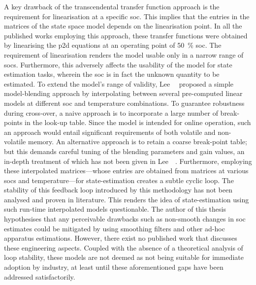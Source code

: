 A  key  drawback  of  the  transcendental  transfer  function  approach  is  the
requirement for  linearisation at  a specific \gls{soc}.  This implies  that the
entries in  the matrices of the  state space model depends  on the linearisation
point.  In all  the  published  works employing  this  approach, these  transfer
functions were obtained  by linearising the \gls{p2d} equations  at an operating
point of  \SI{50}{\percent} \gls{soc}. The requirement  of linearisation renders
the  model usable  only  in  a narrow  range  of  \gls{soc}s. Furthermore,  this
adversely affects the usability of the model for state estimation tasks, wherein
the  \gls{soc} is  in  fact the  unknown  quantity to  be  estimated. To  extend
the  model's range  of  validity, Lee~\etal{}~\cite{Lee2014}  proposed a  simple
model-blending  approach by  interpolating between  several pre-computed  linear
models  at  different  \gls{soc}  and  temperature  combinations.  To  guarantee
robustness during cross-over, a naive approach  is to incorporate a large number
of break-points  in the look-up  table. Since the  model is intended  for online
operation,  such  an approach  would  entail  significant requirements  of  both
volatile  and  non-volatile memory.  An  alternative  approach  is to  retain  a
coarse  break-point table;  but  this  demands careful  tuning  of the  blending
parameters  and  gain values,  an  in-depth  treatment  of  which has  not  been
given  in  Lee~\etal~\cite{Lee2014}.  Furthermore, employing  these  interpolated
matrices---whose entries  are obtained from  matrices at various  \gls{soc}s and
temperature---for state-estimation  creates a subtle cyclic  loop. The stability
of  this feedback  loop introduced  by this  methodology has  not been  analysed
and  proven in  literature.  This  renders the  idea  of state-estimation  using
such  run-time  interpolated models  questionable.  The  author of  this  thesis
hypothesises  that  any perceivable  drawbacks  such  as non-smooth  changes  in
\gls{soc}  estimates could  be mitigated  by using  smoothing filters  and other
ad-hoc  apparatus  estimations. However,  there  exist  no published  work  that
discusses these engineering  aspects. Coupled with the absence  of a theoretical
analysis of  loop stability, these models  are not deemed as  not being suitable
for immediate  adoption by  industry, at least  until these  aforementioned gaps
have been addressed satisfactorily.



